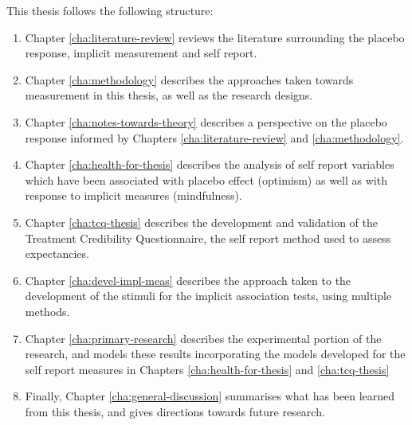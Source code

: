 This thesis follows the following structure:

\begin{enumerate}
\item Chapter \ref{cha:literature-review} reviews the literature surrounding the placebo response, implicit measurement and self report. 
\item Chapter \ref{cha:methodology} describes the approaches taken towards measurement in this thesis, as well as the research designs.
\item Chapter \ref{cha:notes-towards-theory} describes a perspective on the placebo response informed by Chapters \ref{cha:literature-review} and \ref{cha:methodology}.
\item Chapter \ref{cha:health-for-thesis} describes the analysis of self report variables which have been associated with placebo effect (optimism) as well as with response to implicit measures (mindfulness). 
\item Chapter \ref{cha:tcq-thesis} describes the development and validation of the Treatment Credibility Questionnaire, the self report method used to assess expectancies.
\item Chapter \ref{cha:devel-impl-meas} describes the approach taken to the development of the stimuli for the implicit association tests, using multiple methods. 
\item Chapter \ref{cha:primary-research} describes the experimental portion of the research, and models these results incorporating the models developed for the self report measures in Chapters \ref{cha:health-for-thesis} and \ref{cha:tcq-thesis}
\item Finally, Chapter \ref{cha:general-discussion} summarises what has been learned from this thesis, and gives directions towards future research.

\end{enumerate}





